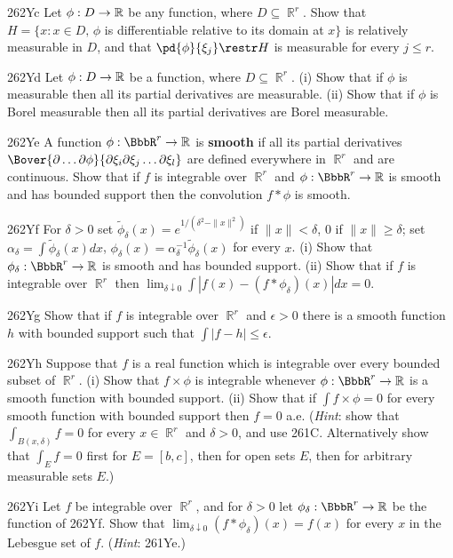 {\spheader 262Yc Let $\phi:D\to\Bbb R$ be any function, where
$D\subseteq\BbbR^r$.   Show that $H=\{x:x\in D,\,\phi$ is differentiable
relative to its domain at $x\}$ is relatively measurable in $D$, and
that $\pd{\phi}{\xi_j}\restr H$ is measurable for every $j\le r$.

\spheader 262Yd
Let $\phi:D\to\Bbb R$ be a function, where
$D\subseteq\BbbR^r$.
(i) Show that if $\phi$ is measurable then all its partial derivatives
are measurable.
(ii) Show that if $\phi$ is Borel
measurable then all its partial derivatives are Borel measurable.

\spheader 262Ye A function $\phi:\BbbR^r\to\Bbb R$ is {\bf smooth} if
all its partial derivatives
$\Bover{\partial\ldots\partial\phi}
{\partial\xi_i\partial\xi_j\ldots\partial\xi_l}$ are defined everywhere
in $\BbbR^r$ and are
continuous.   Show that if $f$ is integrable over $\BbbR^r$ and
$\phi:\BbbR^r\to\Bbb R$ is smooth and has bounded support then the
convolution $f*\phi$ is smooth.   

\spheader 262Yf For $\delta>0$ set
$\tilde\phi_{\delta}(x) =e^{1/(\delta^2-\|x\|^2)}$ if $\|x\|<\delta$,
$0$ if $\|x\|\ge\delta$;  set
$\alpha_{\delta}=\int\tilde\phi_{\delta}(x)dx$,
$\phi_{\delta}(x)=\alpha_{\delta}^{-1}\tilde\phi_{\delta}(x)$ for every
$x$.  (i) Show that $\phi_{\delta}:\BbbR^r\to\Bbb R$ is smooth and has
bounded support.   (ii) Show that if $f$ is integrable over $\BbbR^r$
then $\lim_{\delta\downarrow 0}\int|f(x)-(f*\phi_{\delta})(x)|dx=0$.

\spheader 262Yg Show that if
$f$ is integrable over $\BbbR^r$ and $\epsilon>0$ there is a smooth
function $h$ with bounded support such that $\int|f-h|\le\epsilon$.

\spheader 262Yh Suppose that $f$ is a real function which is integrable
over every bounded subset of $\BbbR^r$.   (i) Show that $f\times\phi$ is
integrable whenever $\phi:\BbbR^r\to\Bbb R$ is a smooth function with
bounded support.   (ii) Show that if $\int f\times\phi=0$ for every
smooth function with bounded support then $f=0$ a.e.   ({\it Hint\/}:
show that
$\int_{B(x,\delta)}f=0$ for every $x\in\BbbR^r$ and $\delta>0$, and use
261C.   Alternatively show that $\int_Ef=0$ first for $E=[b,c]$, then
for open sets $E$, then for arbitrary measurable sets $E$.)

\spheader 262Yi Let $f$ be integrable over $\BbbR^r$, and for $\delta>0$
let $\phi_{\delta}:\BbbR^r\to\Bbb R$ be the function of 262Yf.   Show
that $\lim_{\delta\downarrow 0}(f*\phi_{\delta})(x)=f(x)$ for every $x$
in the Lebesgue set of $f$.   ({\it Hint\/}:  261Ye.)

}%


